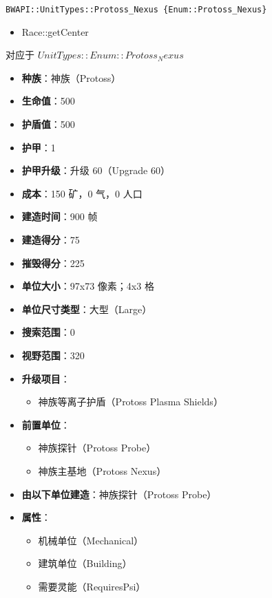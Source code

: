 \begin{tcolorbox}[colback=white, colframe=black!60!white, title=Protoss\_Nexus(), arc=0mm]
    \begin{verbatim}
BWAPI::UnitTypes::Protoss_Nexus {Enum::Protoss_Nexus}
    \end{verbatim}
    \begin{refer}
        \begin{itemize}
            \item Race::getCenter
        \end{itemize}
    \end{refer}
    对应于  $ UnitTypes::Enum::Protoss_Nexus $ 
    \begin{itemize}
        \item \textbf{种族}：神族（Protoss）
        \item \textbf{生命值}：500
        \item \textbf{护盾值}：500
        \item \textbf{护甲}：1
        \item \textbf{护甲升级}：升级 60（Upgrade 60）
        \item \textbf{成本}：150 矿，0 气，0 人口
        \item \textbf{建造时间}：900 帧
        \item \textbf{建造得分}：75
        \item \textbf{摧毁得分}：225
        \item \textbf{单位大小}：97x73 像素；4x3 格
        \item \textbf{单位尺寸类型}：大型（Large）
        \item \textbf{搜索范围}：0
        \item \textbf{视野范围}：320
        \item \textbf{升级项目}：
            \begin{itemize}
                \item 神族等离子护盾（Protoss Plasma Shields）
            \end{itemize}
        \item \textbf{前置单位}：
            \begin{itemize}
                \item 神族探针（Protoss Probe）
                \item 神族主基地（Protoss Nexus）
            \end{itemize}
        \item \textbf{由以下单位建造}：神族探针（Protoss Probe）
        \item \textbf{属性}：
            \begin{itemize}
                \item 机械单位（Mechanical）
                \item 建筑单位（Building）
                \item 需要灵能（RequiresPsi）
            \end{itemize}
    \end{itemize}
\end{tcolorbox}

